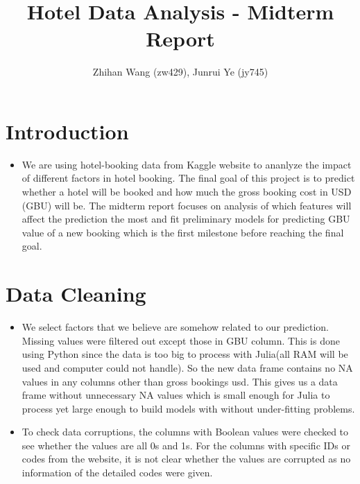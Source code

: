 \documentclass{article}
\title{Hotel Data Analysis - Midterm Report}
\author{Zhihan Wang (zw429), Junrui Ye (jy745)}
\date{}
\begin{document}
\maketitle

\section{Introduction}
\begin{itemize}
    \item We are using hotel-booking data from Kaggle website to ananlyze the impact of different factors in hotel booking. The final goal of this project is to predict whether a hotel will be booked and how much the gross booking cost in USD (GBU) will be. 
The midterm report focuses on analysis of which features will affect the prediction the most and fit preliminary models for predicting GBU value of a new booking which is the first milestone before reaching the final goal.
\end{itemize} 

\section{Data Cleaning}
\begin{itemize}
    \item We select factors that we believe are somehow related to our prediction. Missing values were filtered out except those in GBU column. This is done using Python since the data is too big to process with Julia(all RAM will be used and computer could not handle). So the new data frame contains no NA values in any columns other than gross bookings usd. This gives us a data frame without unnecessary NA values which is small enough for Julia to process yet large enough to build models with without under-fitting problems. 
    \item To check data corruptions, the columns with Boolean values were checked to see whether the values are all 0s and 1s. For the columns with specific IDs or codes from the website, it is not clear whether the values are corrupted as no information of the detailed codes were given.
\end{itemize}
\end{document}
